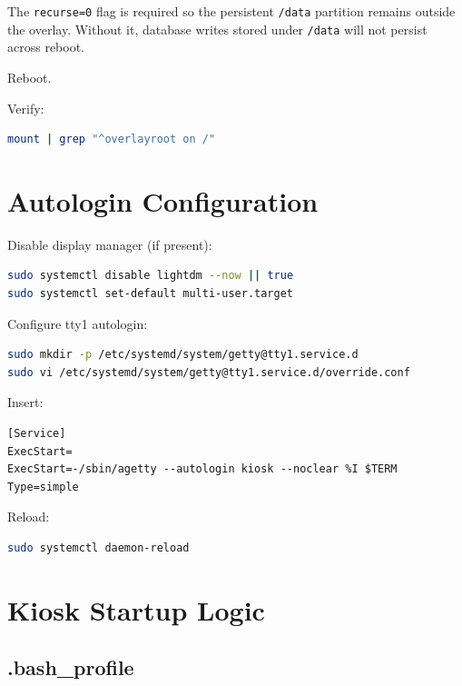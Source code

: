 \documentclass[11pt,letterpaper]{article}
\begin{document}
The \texttt{recurse=0} flag is required so the persistent \texttt{/data}
partition remains outside the overlay. Without it, database writes stored under
\texttt{/data} will not persist across reboot.

Reboot.

Verify:

\begin{lstlisting}[language=bash]
mount | grep "^overlayroot on /"
\end{lstlisting}

\section{Autologin Configuration}

Disable display manager (if present):

\begin{lstlisting}[language=bash]
sudo systemctl disable lightdm --now || true
sudo systemctl set-default multi-user.target
\end{lstlisting}

Configure tty1 autologin:

\begin{lstlisting}[language=bash]
sudo mkdir -p /etc/systemd/system/getty@tty1.service.d
sudo vi /etc/systemd/system/getty@tty1.service.d/override.conf
\end{lstlisting}

Insert:

\begin{lstlisting}
[Service]
ExecStart=
ExecStart=-/sbin/agetty --autologin kiosk --noclear %I $TERM
Type=simple
\end{lstlisting}

Reload:

\begin{lstlisting}[language=bash]
sudo systemctl daemon-reload
\end{lstlisting}

\section{Kiosk Startup Logic}

\subsection{.bash\_profile}
\end{document}
